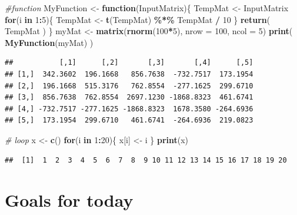 \documentclass[
]{book}
\newenvironment{Shaded}{\begin{snugshade}}{\end{snugshade}}
\newcommand{\CommentTok}[1]{\textcolor[rgb]{0.56,0.35,0.01}{\textit{#1}}}
\newcommand{\ControlFlowTok}[1]{\textcolor[rgb]{0.13,0.29,0.53}{\textbf{#1}}}
\newcommand{\DataTypeTok}[1]{\textcolor[rgb]{0.13,0.29,0.53}{#1}}
\newcommand{\DecValTok}[1]{\textcolor[rgb]{0.00,0.00,0.81}{#1}}
\newcommand{\KeywordTok}[1]{\textcolor[rgb]{0.13,0.29,0.53}{\textbf{#1}}}
\newcommand{\NormalTok}[1]{#1}
\newcommand{\OperatorTok}[1]{\textcolor[rgb]{0.81,0.36,0.00}{\textbf{#1}}}
\newcommand{\StringTok}[1]{\textcolor[rgb]{0.31,0.60,0.02}{#1}}
\theoremstyle{definition}
\theoremstyle{definition}
\theoremstyle{definition}
\theoremstyle{remark}
\begin{document}
\begin{Shaded}
\begin{Highlighting}[]
\CommentTok{\#function }
\NormalTok{MyFunction <{-}}\StringTok{ }\ControlFlowTok{function}\NormalTok{(InputMatrix)\{ }
\NormalTok{  TempMat <{-}}\StringTok{ }\NormalTok{InputMatrix}
  \ControlFlowTok{for}\NormalTok{(i }\ControlFlowTok{in} \DecValTok{1}\OperatorTok{:}\DecValTok{5}\NormalTok{)\{}
\NormalTok{    TempMat <{-}}\StringTok{ }\KeywordTok{t}\NormalTok{(TempMat)  }\OperatorTok{\%*\%}\StringTok{ }\NormalTok{TempMat }\OperatorTok{/}\StringTok{ }\DecValTok{10}
\NormalTok{  \} }
  \KeywordTok{return}\NormalTok{( TempMat )}
\NormalTok{\}}
\NormalTok{myMat <{-}}\StringTok{ }\KeywordTok{matrix}\NormalTok{(}\KeywordTok{rnorm}\NormalTok{(}\DecValTok{100}\OperatorTok{*}\DecValTok{5}\NormalTok{), }\DataTypeTok{nrow =} \DecValTok{100}\NormalTok{, }\DataTypeTok{ncol =} \DecValTok{5}\NormalTok{)}
\KeywordTok{print}\NormalTok{( }\KeywordTok{MyFunction}\NormalTok{(myMat) ) }
\end{Highlighting}
\end{Shaded}

\begin{verbatim}
##           [,1]      [,2]       [,3]       [,4]      [,5]
## [1,]  342.3602  196.1668   856.7638  -732.7517  173.1954
## [2,]  196.1668  515.3176   762.8554  -277.1625  299.6710
## [3,]  856.7638  762.8554  2697.1230 -1868.8323  461.6741
## [4,] -732.7517 -277.1625 -1868.8323  1678.3580 -264.6936
## [5,]  173.1954  299.6710   461.6741  -264.6936  219.0823
\end{verbatim}

\begin{Shaded}
\begin{Highlighting}[]
\CommentTok{\# loop }
\NormalTok{x <{-}}\StringTok{ }\KeywordTok{c}\NormalTok{() }
\ControlFlowTok{for}\NormalTok{(i }\ControlFlowTok{in} \DecValTok{1}\OperatorTok{:}\DecValTok{20}\NormalTok{)\{}
\NormalTok{  x[i] <{-}}\StringTok{ }\NormalTok{i }
\NormalTok{\}}
\KeywordTok{print}\NormalTok{(x) }
\end{Highlighting}
\end{Shaded}

\begin{verbatim}
##  [1]  1  2  3  4  5  6  7  8  9 10 11 12 13 14 15 16 17 18 19 20
\end{verbatim}

\hypertarget{goals-for-today}{%
\section{Goals for today}\label{goals-for-today}}
\end{document}
